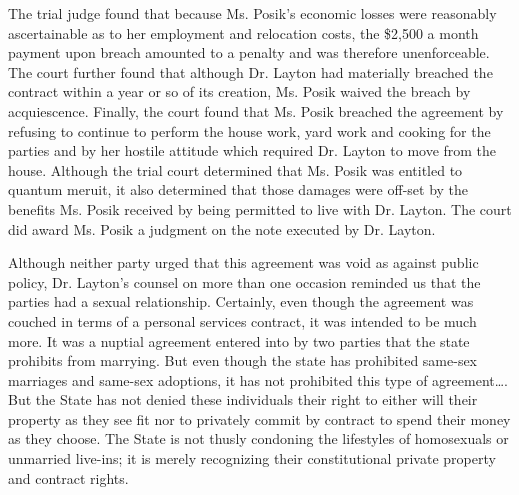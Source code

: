 The trial judge found that because Ms. Posik's economic losses were reasonably
ascertainable as to her employment and relocation costs, the \$2,500 a month
payment upon breach amounted to a penalty and was therefore unenforceable. The
court further found that although Dr. Layton had materially breached the
contract within a year or so of its creation, Ms. Posik waived the breach by
acquiescence. Finally, the court found that Ms. Posik breached the agreement by
refusing to continue to perform the house work, yard work and cooking for the
parties and by her hostile attitude which required Dr. Layton to move from the
house. Although the trial court determined that Ms. Posik was entitled to
quantum meruit, it also determined that those damages were off-set by the
benefits Ms. Posik received by being permitted to live with Dr. Layton. The
court did award Ms. Posik a judgment on the note executed by Dr. Layton.

Although neither party urged that this agreement was void as against public
policy, Dr. Layton's counsel on more than one occasion reminded us that the
parties had a sexual relationship. Certainly, even though the agreement was
couched in terms of a personal services contract, it was intended to be much
more. It was a nuptial agreement entered into by two parties that the state
prohibits from marrying. But even though the state has prohibited same-sex
marriages and same-sex adoptions, it has not prohibited this type of
agreement\dots. But the State has not denied these individuals their right to
either will their property as they see fit nor to privately commit by contract
to spend their money as they choose. The State is not thusly condoning the
lifestyles of homosexuals or unmarried live-ins; it is merely
recognizing their constitutional private property and contract rights.

